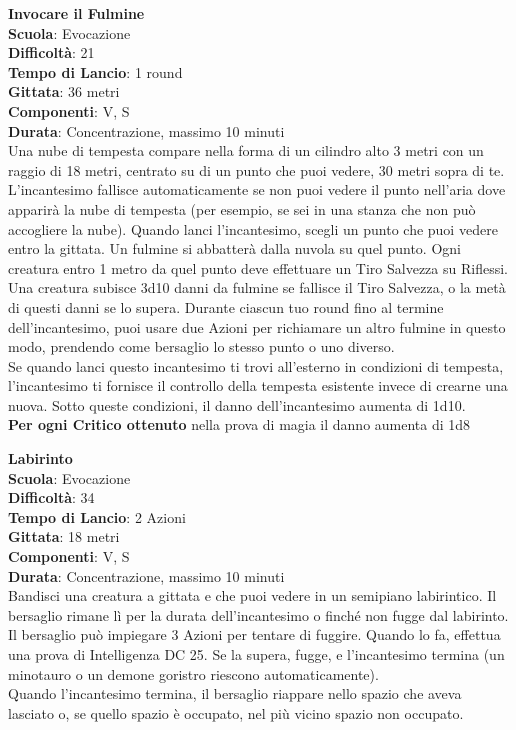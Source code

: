 \begin{multicols}{2}
\medskip\textbf{Invocare il Fulmine}\\
\textbf{Scuola}: Evocazione\\
\textbf{Difficoltà}: 21\\
\textbf{Tempo di Lancio}: 1 round\\
\textbf{Gittata}: 36 metri\\
\textbf{Componenti}: V, S\\
\textbf{Durata}: Concentrazione, massimo 10 minuti\\
Una nube di tempesta compare nella forma di un cilindro alto 3 metri con un raggio di 18 metri, centrato su di un punto che puoi vedere, 30 metri sopra di te. L'incantesimo fallisce automaticamente se non puoi vedere il punto nell'aria dove apparirà la nube di tempesta (per esempio, se sei in una stanza che non può accogliere la nube). Quando lanci l'incantesimo, scegli un punto che puoi vedere entro la gittata. Un fulmine si abbatterà dalla nuvola su quel punto. Ogni creatura entro 1 metro da quel punto deve effettuare un Tiro Salvezza su Riflessi. Una creatura subisce 3d10 danni da fulmine se fallisce il Tiro Salvezza, o la metà di questi danni se lo supera. Durante ciascun tuo round fino al termine dell'incantesimo, puoi usare due Azioni per richiamare un altro fulmine in questo modo, prendendo come bersaglio lo stesso punto o uno diverso.\\
Se quando lanci questo incantesimo ti trovi all'esterno in condizioni di tempesta, l'incantesimo ti fornisce il controllo della tempesta esistente invece di crearne una nuova. Sotto queste condizioni, il danno dell'incantesimo aumenta di 1d10. \\
\textbf{Per ogni Critico ottenuto} nella prova di magia il danno aumenta di 1d8

\medskip\textbf{Labirinto}\\
\textbf{Scuola}: Evocazione\\
\textbf{Difficoltà}: 34\\
\textbf{Tempo di Lancio}: 2 Azioni\\
\textbf{Gittata}: 18 metri\\
\textbf{Componenti}: V, S\\
\textbf{Durata}: Concentrazione, massimo 10 minuti\\
Bandisci una creatura a gittata e che puoi vedere in un semipiano labirintico. Il bersaglio rimane lì per la durata dell'incantesimo o finché non fugge dal labirinto. Il bersaglio può impiegare 3 Azioni per tentare di fuggire. Quando lo fa, effettua una prova di Intelligenza DC 25. Se la supera, fugge, e l'incantesimo termina (un minotauro o un demone goristro riescono automaticamente).\\
Quando l'incantesimo termina, il bersaglio riappare nello spazio che aveva lasciato o, se quello spazio è occupato, nel più vicino spazio non occupato. 


\end{multicols}
